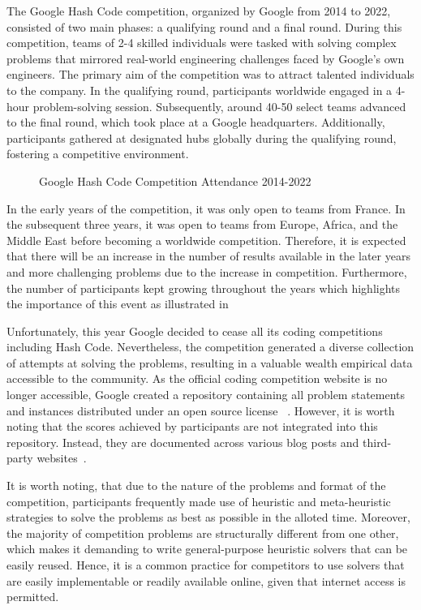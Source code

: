 The Google Hash Code competition, organized by Google from 2014 to 2022,
consisted of two main phases: a qualifying round and a final round. During this
competition, teams of 2-4 skilled individuals were tasked with solving complex
problems that mirrored real-world engineering challenges faced by Google's own
engineers. The primary aim of the competition was to attract talented
individuals to the company. In the qualifying round, participants worldwide
engaged in a 4-hour problem-solving session. Subsequently, around 40-50 select
teams advanced to the final round, which took place at a Google headquarters.
Additionally, participants gathered at designated hubs globally during the
qualifying round, fostering a competitive environment.

\begin{figure}[ht]
  \centering
  
  \caption{Google Hash Code Competition Attendance 2014-2022}
  \label{fig:hashcode-attendance}
\end{figure}

In the early years of the competition, it was only open to teams from France. In
the subsequent three years, it was open to teams from Europe, Africa, and the
Middle East before becoming a worldwide competition. Therefore, it is expected
that there will be an increase in the number of results available in the later
years and more challenging problems due to the increase in competition. Furthermore,
the number of participants kept growing throughout the years which highlights
the importance of this event as illustrated in~

Unfortunately, this year Google decided to cease all its coding competitions
including Hash Code. Nevertheless, the competition generated a diverse
collection of attempts at solving the problems, resulting in a valuable wealth
empirical data accessible to the community. As the official coding competition
website is no longer accessible, Google created a repository containing all
problem statements and instances distributed under an open source license
~\cite{googlellc2023codingcompetitionsarchive}. However, it is worth noting that the
scores achieved by participants are not integrated into this repository.
Instead, they are documented across various blog posts and third-party
websites~\cite{zibada2023google}.

It is worth noting, that due to the nature of the problems and format of the
competition, participants frequently made use of heuristic and meta-heuristic
strategies to solve the problems as best as possible in the alloted time.
Moreover, the majority of competition problems are structurally different from
one other, which makes it demanding to write general-purpose heuristic solvers
that can be easily reused. Hence, it is a common practice for competitors to use
solvers that are  easily implementable or readily available online, given that
internet access is permitted.